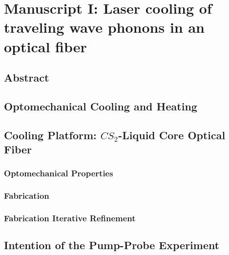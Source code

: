 \setcounter{rownumber}{0}
\chapter{Manuscript I: Laser cooling of traveling wave phonons in an optical fiber}
\label{ch:Cooling}
\acresetall


\section{Abstract}
\label{sec:Cooling:Abstract}


\section{Optomechanical Cooling and Heating}
\label{sec:Cooling:Cooling-Heating}


\section{Cooling Platform: \texorpdfstring{$CS_{2}$}{CS2}-Liquid Core Optical Fiber}
\label{sec:Cooling:Platform}


\subsection{Optomechanical Properties}
\label{subsec:Cooling:Platform:Properties}


\subsection{Fabrication}
\label{subsec:Cooling:Platform:Fabrication}


\subsection{Fabrication Iterative Refinement}
\label{subsec:Cooling:Platform:Refinement}


\section{Intention of the Pump-Probe Experiment}
\label{sec:Cooling:Intention}

